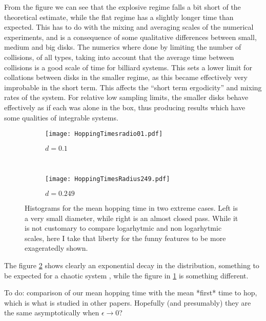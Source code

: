 \documentclass[a4paper,10pt]{article}
\begin{document}
From the figure we can see that the explosive regime falls a bit short of
the theoretical estimate, while  the flat regime has a slightly longer
time than expected. This has to do with the mixing and averaging scales
of the numerical experiments, and is a consequence of some
qualitative differences between small, medium and big disks. The numerics where done
by limiting the number of collisions, of all types, taking into account
that the average time between collisions is a good scale of time
for billiard systems. This sets a lower limit for collations between
disks in the smaller regime, as this became effectively very
improbable in the short term. This affects the ``short term ergodicity'' and
mixing rates of the system. For relative low sampling limits, the
smaller disks behave effectively as if each was alone in the box, thus
producing results which have some qualities of integrable systems. 

\begin{figure}[h]
        \centering
        \begin{subfigure}[b]{0.45\textwidth}
                \centering
                \texttt{[image: HoppingTimesradio01.pdf]}
                \caption{$d=0.1$}
                \label{smallradious}
        \end{subfigure}%
        ~ %
        \begin{subfigure}[b]{0.45\textwidth}
                \centering
                \texttt{[image: HoppingTimesRadius249.pdf]}
                \caption{$d=0.249$}
                \label{bigradious}
        \end{subfigure}       
        \caption{Histograms for the mean hopping time
in two extreme cases. Left is a very small diameter, while right is an almost
closed pass. While it is not customary to compare logarhytmic and non
logarhytmic scales, here I take that liberty for the funny features to be
more exageratedly shown.}\label{histohopps}
\end{figure}

The figure \ref{bigradious} shows clearly an exponential decay in the
distribution, something to be expected for a chaotic system \cite{OttLibro} , while the
figure in \ref{smallradious} is something different. 

To do: comparison of our mean hopping time with the mean *first* time to hop, which is what is studied in other papers.
Hopefully (and presumably) they are the same asymptotically when $\epsilon \to 0$?
\end{document}
